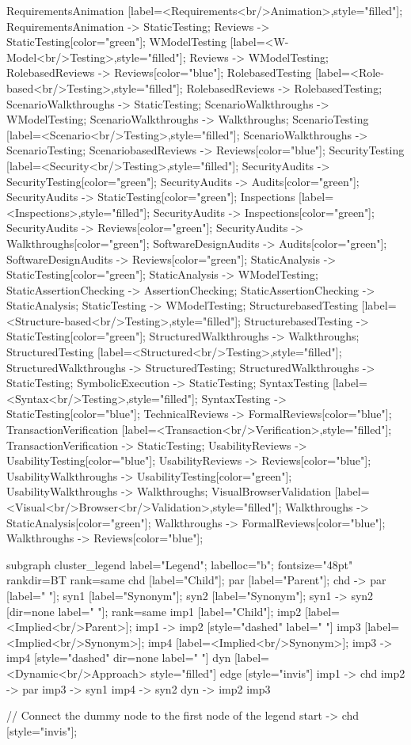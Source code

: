 \documentclass{article}
\begin{document}
{RequirementsAnimation [label=<Requirements<br/>Animation>,style="filled"];
RequirementsAnimation -> StaticTesting;
Reviews -> StaticTesting[color="green"];
WModelTesting [label=<W-Model<br/>Testing>,style="filled"];
Reviews -> WModelTesting;
RolebasedReviews -> Reviews[color="blue"];
RolebasedTesting [label=<Role-based<br/>Testing>,style="filled"];
RolebasedReviews -> RolebasedTesting;
ScenarioWalkthroughs -> StaticTesting;
ScenarioWalkthroughs -> WModelTesting;
ScenarioWalkthroughs -> Walkthroughs;
ScenarioTesting [label=<Scenario<br/>Testing>,style="filled"];
ScenarioWalkthroughs -> ScenarioTesting;
ScenariobasedReviews -> Reviews[color="blue"];
SecurityTesting [label=<Security<br/>Testing>,style="filled"];
SecurityAudits -> SecurityTesting[color="green"];
SecurityAudits -> Audits[color="green"];
SecurityAudits -> StaticTesting[color="green"];
Inspections [label=<Inspections>,style="filled"];
SecurityAudits -> Inspections[color="green"];
SecurityAudits -> Reviews[color="green"];
SecurityAudits -> Walkthroughs[color="green"];
SoftwareDesignAudits -> Audits[color="green"];
SoftwareDesignAudits -> Reviews[color="green"];
StaticAnalysis -> StaticTesting[color="green"];
StaticAnalysis -> WModelTesting;
StaticAssertionChecking -> AssertionChecking;
StaticAssertionChecking -> StaticAnalysis;
StaticTesting -> WModelTesting;
StructurebasedTesting [label=<Structure-based<br/>Testing>,style="filled"];
StructurebasedTesting -> StaticTesting[color="green"];
StructuredWalkthroughs -> Walkthroughs;
StructuredTesting [label=<Structured<br/>Testing>,style="filled"];
StructuredWalkthroughs -> StructuredTesting;
StructuredWalkthroughs -> StaticTesting;
SymbolicExecution -> StaticTesting;
SyntaxTesting [label=<Syntax<br/>Testing>,style="filled"];
SyntaxTesting -> StaticTesting[color="blue"];
TechnicalReviews -> FormalReviews[color="blue"];
TransactionVerification [label=<Transaction<br/>Verification>,style="filled"];
TransactionVerification -> StaticTesting;
UsabilityReviews -> UsabilityTesting[color="blue"];
UsabilityReviews -> Reviews[color="blue"];
UsabilityWalkthroughs -> UsabilityTesting[color="green"];
UsabilityWalkthroughs -> Walkthroughs;
VisualBrowserValidation [label=<Visual<br/>Browser<br/>Validation>,style="filled"];
Walkthroughs -> StaticAnalysis[color="green"];
Walkthroughs -> FormalReviews[color="blue"];
Walkthroughs -> Reviews[color="blue"];

subgraph cluster_legend {
    label="Legend";
    labelloc="b";
    fontsize="48pt"
    rankdir=BT
    {
        rank=same
        chd [label="Child"];
        par [label="Parent"];
        chd -> par [label="                "];
        syn1 [label="Synonym"];
        syn2 [label="Synonym"];
        syn1 -> syn2 [dir=none label="                "];
    }
    {
        rank=same
        imp1 [label="Child"];
        imp2 [label=<Implied<br/>Parent>];
        imp1 -> imp2 [style="dashed" label="                "]
        imp3 [label=<Implied<br/>Synonym>];
        imp4 [label=<Implied<br/>Synonym>];
        imp3 -> imp4 [style="dashed" dir=none label="                "]
    }
        dyn [label=<Dynamic<br/>Approach> style="filled"]
    edge [style="invis"]
    imp1 -> chd
    imp2 -> par
    imp3 -> syn1
    imp4 -> syn2
dyn -> { imp2 imp3 }
}

// Connect the dummy node to the first node of the legend
start -> chd [style="invis"];
}
\end{document}
